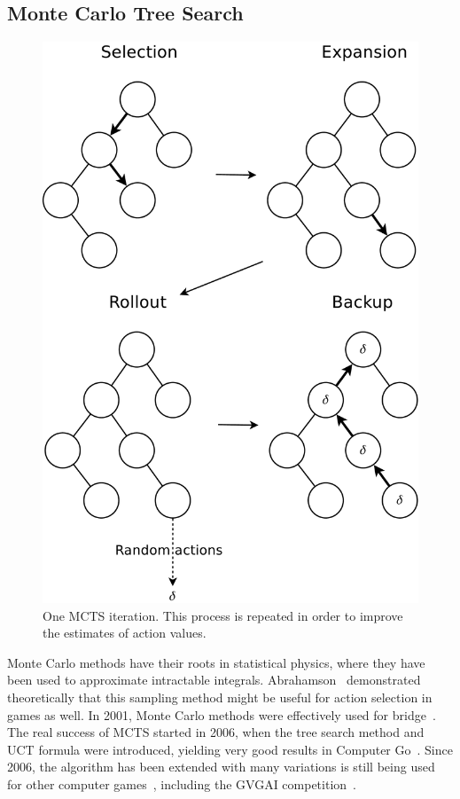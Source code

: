\subsection{Monte Carlo Tree Search}
\begin{figure}
	\centering
	\includegraphics[width=.6\columnwidth]{includes/mcts-eps-converted-to.pdf}
	\caption{One MCTS iteration. This process is repeated in order to improve
	the estimates of action values.}
\label{fig:mcts}
\end{figure}

\label{subsec:mcts}
Monte Carlo methods have their roots in statistical physics, where they have
been used to approximate intractable integrals. 
Abrahamson~\cite{abramson1990expected} demonstrated theoretically that this sampling method might be
useful for action selection in games as well.  In 2001, Monte Carlo methods were
effectively used for bridge~\cite{ginsberg2001gib}. The real success of MCTS
started in 2006, when the tree search method and UCT formula were introduced,
yielding very good results in Computer Go~\cite{gelly2006modification}. Since
2006, the algorithm has been extended with many variations is still being used
for other computer games~\cite{browne2012survey}, including the GVGAI
competition~\cite{perez2014knowledge}.

